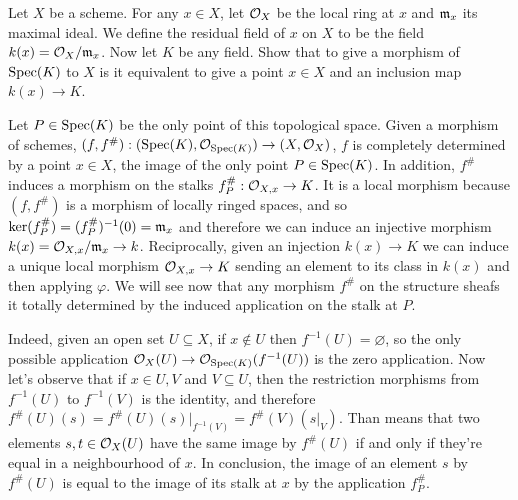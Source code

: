 \begin{ex}
	Let $X$ be a scheme. For any $x \in X$, let $\mathcal{O}_X$ be the local ring at $x$ and $\mathfrak{m}_x$ its maximal ideal. We define the residual field of $x$ on $X$ to be the field $k(x) = \mathcal{O}_X/\mathfrak{m}_x$. Now let $K$ be any field. Show that to give a morphism of $\mathrm{Spec} (K)$ to $X$ is it equivalent to give a point $x \in X$ and an inclusion map $k(x) \to K$.
\end{ex}

\begin{sol}
	Let $P \in \mathrm{Spec} (K)$ be the only point of this topological space. Given a morphism of schemes, $(f,f^{\#}): (\mathrm{Spec} (K), \mathcal{O}_{\mathrm{Spec}(K)}) \to (X, \mathcal{O}_X)$, $f$ is completely determined by a point $x \in X$, the image of the only point $P \in \mathrm{Spec}(K)$. In addition, $f^{\#}$ induces a morphism on the stalks $f^{\#}_P: \mathcal{O}_{X,x} \to K$. It is a local morphism because $(f,f^{\#})$ is a morphism of locally ringed spaces, and so $\ker(f^{\#}_P) = (f^{\#}_P)^{-1}(0) = \mathfrak{m}_x$ and therefore we can induce an injective morphism $k(x) = \mathcal{O}_{X,x}/\mathfrak{m}_x \to k$. Reciprocally, given an injection $k(x) \to K$ we can induce a unique local morphism $\mathcal{O}_{X,x} \to K$ sending an element to its class in $k(x)$ and then applying $\varphi$. We will see now that any morphism $f^{\#}$ on the structure sheafs it totally determined by the induced application on the stalk at $P$. 


	Indeed, given an open set $U \subseteq X$, if $x \notin U$ then $f^{-1}(U) = \varnothing$, so the only possible application $\mathcal{O}_X(U) \to \mathcal{O}_{\mathrm{Spec}(K)}(f^{-1}(U))$ is the zero application. Now let's observe that if $x \in U,V$ and $V \subseteq U$, then the restriction morphisms from $f^{-1}(U)$ to $f^{-1}(V)$ is the identity, and therefore $f^{\#}(U)(s) = f^{\#}(U)(s)|_{f^{-1}(V)} = f^{\#}(V)(s|_V)$. Than means that two elements $s,t \in \mathcal{O}_X(U)$ have the same image by $f^{\#}(U)$ if and only if they're equal in a neighbourhood of $x$. In conclusion, the image of an element $s$ by $f^{\#}(U)$ is equal to the image of its stalk at $x$ by the application $f^{\#}_P$. 


\end{sol}
